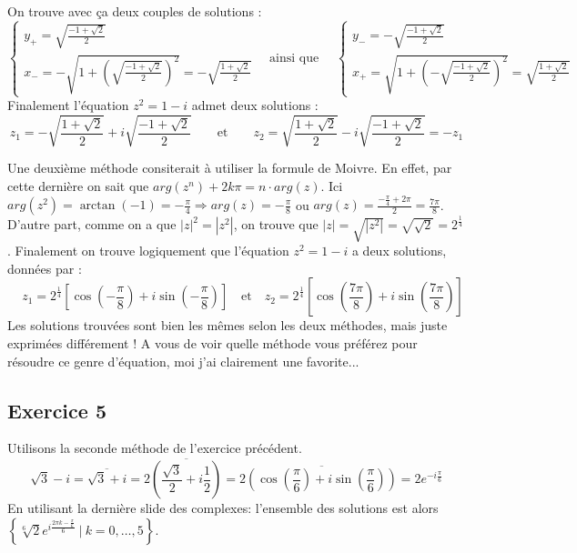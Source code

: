 \documentclass{article}
\begin{document}
\noindent On trouve avec ça deux couples de solutions :
\begin{equation*}
    \begin{cases}
       y_+ = \sqrt{\frac{-1+\sqrt{2}}{2}} \\
       x_-  = -\sqrt{1+( \sqrt{\frac{-1+\sqrt{2}}{2}})^2} =  -\sqrt{\frac{1+\sqrt{2}}{2}}
    \end{cases}
    \quad \textrm{ainsi que } \quad
     \begin{cases}
       y_- = -\sqrt{\frac{-1+\sqrt{2}}{2}} \\
       x_+  = \sqrt{1+(- \sqrt{\frac{-1+\sqrt{2}}{2}})^2} =  \sqrt{\frac{1+\sqrt{2}}{2}}
    \end{cases}
\end{equation*}
Finalement l'équation $z^2 = 1-i$ admet deux solutions :
\begin{equation*}
    z_1 = -\sqrt{\frac{1+\sqrt{2}}{2}}+i \sqrt{\frac{-1+\sqrt{2}}{2}}
    \qquad
    \textrm{et}
    \qquad z_2 = \sqrt{\frac{1+\sqrt{2}}{2}}-i \sqrt{\frac{-1+\sqrt{2}}{2}}=-z_1
\end{equation*}

\noindent Une deuxième méthode consiterait à utiliser la formule de Moivre. En effet, par cette dernière on sait que $arg(z^n)+2k\pi = n \cdot arg(z)$. Ici $arg(z^2) = \arctan{(-1)} = -\frac{\pi}{4} \Rightarrow arg(z) = -\frac{\pi}{8}$ ou $arg(z) =  \frac{-\frac{\pi}{4}+2\pi}{2} = \frac{7\pi}{8}$. D'autre part, comme on a que $|z|^2 = |z^2|$, on trouve que $|z| = \sqrt{|z^2|} = \sqrt{\sqrt{2}}= 2^{\frac{1}{4}}$. Finalement on trouve logiquement que l'équation $z^2 = 1 -i$ a deux solutions, données par : 
\begin{equation*}
  \quad z_1 = 2^{\frac{1}{4}}\left[\cos\left(-\frac{\pi}{8}\right)+i\sin\left(-\frac{\pi}{8}\right)\right] \quad \textrm{et} \quad z_2= 2^{\frac{1}{4}}\left[\cos\left(\frac{7\pi}{8}\right)+i\sin\left(\frac{7\pi}{8}\right)\right]
\end{equation*}
Les solutions trouvées sont bien les mêmes selon les deux méthodes, mais juste exprimées différement ! A vous de voir quelle méthode vous préférez pour résoudre ce genre d'équation, moi j'ai clairement une favorite...

\subsection{Exercice 5}
Utilisons la seconde méthode de l'exercice précédent. 
$$\sqrt{3}-i=\overline{\sqrt{3}+i} = 2\overline{\left(\frac{\sqrt{3}}{2}+i\frac{1}{2}\right)} = 2\overline{\left(\cos\left(\frac{\pi}{6}\right) + i\sin\left(\frac{\pi}{6}\right)\right)} = 2e^{-i\frac{\pi}{6}}
$$
En utilisant la dernière slide des complexes: l'ensemble des solutions est alors $\left\{\sqrt[6]{2}e^{i\frac{2\pi k - \frac{\pi}{6}}{6}} \ | \ k = 0, \hdots, 5\right\}$.
\end{document}
